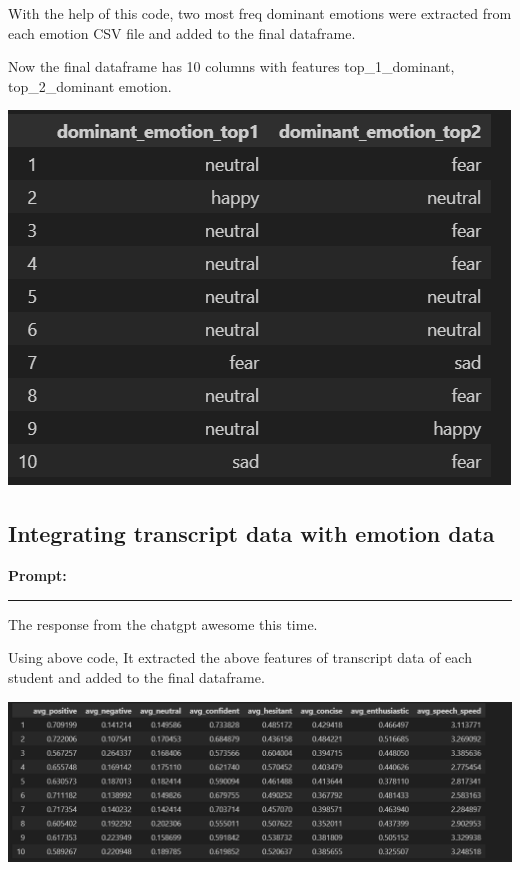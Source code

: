 \documentclass[11pt,a4paper]{article}
\begin{document}
\large{With the help of this code, two most freq dominant emotions were extracted from each emotion CSV file and added to the final dataframe.\\}

\large{

Now the final dataframe has 10 columns with features top\_1\_dominant, top\_2\_dominant emotion.}
\begin{center}
    \includegraphics[width=1\columnwidth]{images_prompts/dominant_emotion.png}
\end{center}

\subsection{Integrating transcript data with emotion data}

\textbf{Prompt:}
\begin{tcolorbox}
    
\end{tcolorbox}
\begin{center}
    \color{red}\rule{1\linewidth}{0.5mm}
\end{center}

\begin{responsebox}
    The response from the chatgpt awesome this time.
\end{responsebox}

\begin{tcolorbox}
    
\end{tcolorbox}

\large{Using above code, It extracted the above features of transcript data of each student and added to the final dataframe.}
\begin{center}
    \includegraphics[width=1\columnwidth]{images_prompts/trans_df.png}
\end{center}
\end{document}
